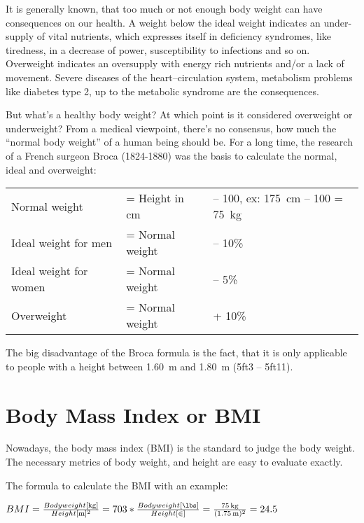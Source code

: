 \documentclass[../main.tex]{subfiles}
\begin{document}
It is generally known, that too much or not enough body weight can have consequences on our health.
A weight below the ideal weight indicates an under-supply of vital nutrients, which expresses itself in deficiency syndromes,
like tiredness, in a decrease of power, susceptibility to infections and so on.
Overweight indicates an oversupply with energy rich nutrients and/or a lack of movement.
Severe diseases of the heart--circulation system, metabolism problems like diabetes type 2, up to the metabolic syndrome are the consequences.

But what's a healthy body weight? At which point is it considered overweight or underweight?
From a medical viewpoint, there's no consensus, how much the ``normal body weight'' of a human being should be.
For  a long time, the research of a French surgeon Broca (1824-1880) was the basis to calculate the normal, ideal and overweight:

\noindent
\begin{tabular}{lll}
  Normal weight & = Height in \unit{\cm} &-- 100, ex: \SI{175}{\cm} -- 100 = \SI{75}{\kg} \\
  Ideal weight for men & = Normal weight &-- 10\% \\
  Ideal weight for women & = Normal weight &-- 5\% \\
  Overweight & = Normal weight &+ 10\% \\
\end{tabular}

The big disadvantage of the Broca formula is the fact, that it is only applicable to people with a height between \SI{1.60}{\m} and \SI{1.80}{\m} (5ft3 -- 5ft11).

\section{Body Mass Index or BMI}

Nowadays, the body mass index (BMI) is the standard to judge the body weight.
The necessary metrics of body weight, and height are easy to evaluate exactly.

The formula to calculate the BMI with an example:

\vspace{2mm}
\begin{center}
  \begin{fminipage}{10cm}
  $BMI = \frac{Body weight [\unit{\kg}]}{Height [\unit{\m}]^2} = 703 * \frac{Body weight [\unit{\lbs}]}{Height [\unit{\in}]}
  = \frac{\SI{75}{\kg}}{(\SI{1.75}{\m})^2} = 24.5$
  \end{fminipage}
\end{center}
\end{document}

